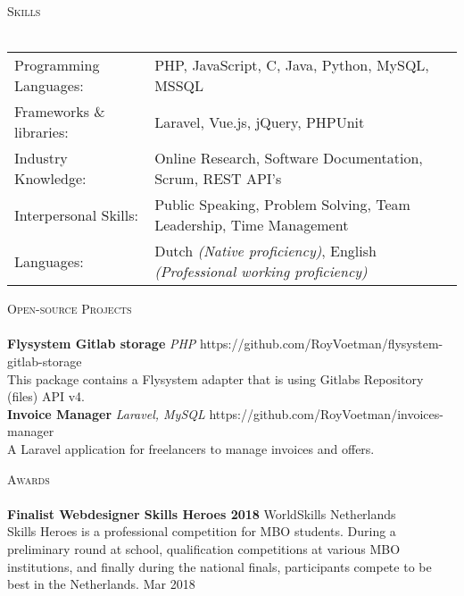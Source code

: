 \documentclass[a4paper]{article}
\newcommand{\lineunder} {
    \vspace*{-8pt} \\
    \hspace*{-18pt} \hrulefill \\
}
\newcommand{\header} [1] {
    {\hspace*{-18pt}\vspace*{6pt} \textsc{#1}}
    \vspace*{-6pt} \lineunder
}
\begin{document}
\header{Skills}
\begin{tabular}{ l l }
	Programming Languages:   & PHP, JavaScript, C, Java, Python, MySQL, MSSQL                     \\
    Frameworks \& libraries: & Laravel, Vue.js, jQuery, PHPUnit                                   \\
	Industry Knowledge:      & Online Research, Software Documentation, Scrum, REST API's         \\
	Interpersonal Skills:    & Public Speaking, Problem Solving, Team Leadership, Time Management \\
    Languages:               & Dutch \emph{(Native proficiency)}, English \emph{(Professional working proficiency)}\\
\end{tabular}
\vspace{2mm}

\header{Open-source Projects}
{\textbf{Flysystem Gitlab storage}} {\sl PHP} \hfill https://github.com/RoyVoetman/flysystem-gitlab-storage\\
This package contains a Flysystem adapter that is using Gitlab\textquotesingle{}s Repository (files) API v4.\\
\vspace*{2mm}
{\textbf{Invoice Manager}} {\sl Laravel, MySQL} \hfill https://github.com/RoyVoetman/invoices-manager\\
A Laravel application for freelancers to manage invoices and offers.\\
\vspace*{2mm}

\header{Awards}
\textbf{Finalist Webdesigner Skills Heroes 2018} \hfill WorldSkills Netherlands\\
Skills Heroes is a professional competition for MBO students. During a preliminary round at school, qualification competitions at various MBO institutions, and finally during the national finals, participants compete to be best in the Netherlands. \hfill Mar 2018\\
\vspace*{2mm}

\ 
\end{document}
